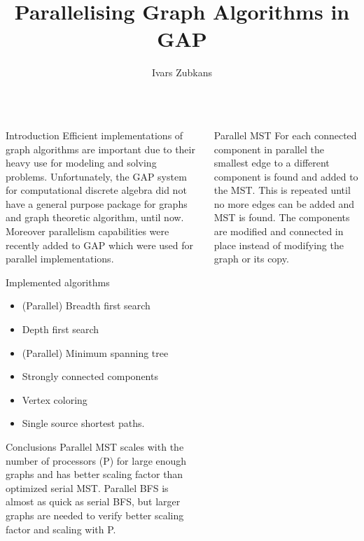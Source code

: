\documentclass[serif,mathserif,final]{beamer}
\title{Parallelising Graph Algorithms in GAP}
\author{Ivars Zubkans}
\institute{University of St Andrews}
\begin{document}
\begin{frame}{}
  \begin{columns}[t]

    \begin{column}{0.32\linewidth}

      \begin{block}{Introduction}
        Efficient implementations of graph algorithms are important due to their heavy use for modeling and solving problems. Unfortunately, the GAP system for computational discrete algebra did not have a general purpose package for graphs and graph theoretic algorithm, until now. Moreover parallelism capabilities were recently added to GAP which were used for parallel implementations.
      \end{block}

      \begin{block}{Implemented algorithms}
        \begin{itemize}
        	\item (Parallel) Breadth first search
        	\item Depth first search
        	\item (Parallel) Minimum spanning tree
        	\item Strongly connected components
        	\item Vertex coloring
        	\item Single source shortest paths.
        \end{itemize}
      \end{block}
      
      \begin{block}{Conclusions}
        Parallel MST scales with the number of processors (P) for large enough graphs and has better scaling factor than optimized serial MST. Parallel BFS is almost as quick as serial BFS, but larger graphs are needed to verify better scaling factor and scaling with P.
      \end{block}

    \end{column}%

    \begin{column}{0.32\linewidth}

      \begin{block}{Parallel MST}
        For each connected component in parallel the smallest edge to a different component is found and added to the MST. This is repeated until no more edges can be added and MST is found. The components are modified and connected in place instead of modifying the graph or its copy.
      \end{block}
      

\end{column}
\end{columns}
\end{frame}
\end{document}
